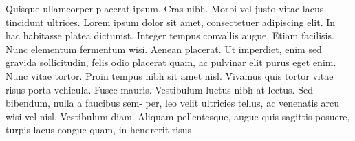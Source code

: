\documentclass[11pt,a4paper]{article}
\begin{document}
Quisque ullamcorper placerat ipsum. Cras nibh. Morbi vel justo vitae lacus tincidunt
ultrices. Lorem ipsum dolor sit amet, consectetuer adipiscing elit. In hac habitasse platea
dictumst. Integer tempus convallis augue. Etiam facilisis. Nunc elementum fermentum
wisi. Aenean placerat. Ut imperdiet, enim sed gravida sollicitudin, felis odio placerat
quam, ac pulvinar elit purus eget enim. Nunc vitae tortor. Proin tempus nibh sit amet
nisl. Vivamus quis tortor vitae risus porta vehicula.
Fusce mauris. Vestibulum luctus nibh at lectus. Sed bibendum, nulla a faucibus sem-
per, leo velit ultricies tellus, ac venenatis arcu wisi vel nisl. Vestibulum diam. Aliquam
pellentesque, augue quis sagittis posuere, turpis lacus congue quam, in hendrerit risus
\end{document}
